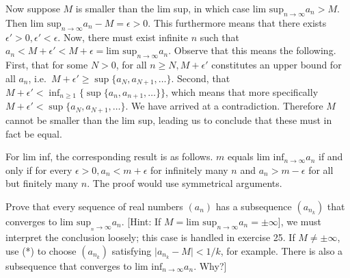 \begin{solution}
    Now suppose $M$ is smaller than the lim sup, in which case $\text{lim sup}_{n\rightarrow \infty} a_n > M$. Then $\text{lim sup}_{n\rightarrow \infty} a_n - M = \epsilon > 0$. This furthermore means that there exists $\epsilon' > 0, \epsilon' < \epsilon$. Now, there must exist infinite $n$ such that $a_n < M + \epsilon' < M + \epsilon = \text{lim sup}_{n \rightarrow \infty} a_n$. Observe that this means the following. First, that for some $N > 0$, for all $n \geq N, M + \epsilon'$ constitutes an upper bound for all $a_n$, i.e.\ $M + \epsilon' \geq \sup\{a_N, a_{N+1}, \ldots\}$. Second, that $M + \epsilon' < \inf_{n \geq 1}\{\sup\{a_n, a_{n+1}, \ldots\}\}$, which means that more specifically $M + \epsilon' < \sup\{a_N, a_{N+1}, \ldots\}$. We have arrived at a contradiction. Therefore $M$ cannot be smaller than the lim sup, leading us to conclude that these must in fact be equal.

    For lim inf, the corresponding result is as follows. $m$ equals $\text{lim inf}_{n \rightarrow \infty} a_n$ if and only if for every $\epsilon > 0, a_n < m + \epsilon$ for infinitely many $n$ and $a_n > m - \epsilon$ for all but finitely many $n$. The proof would use symmetrical arguments.
\end{solution}

\begin{exercise}{27}
    Prove that every sequence of real numbers $(a_n)$ has a subsequence $(a_{n_k})$ that converges to $\text{lim sup}_{_n \rightarrow \infty} a_n$. [Hint: If $M = \text{lim sup}_{n \rightarrow \infty} a_n = \pm \infty$], we must interpret the conclusion loosely; this case is handled in exercise 25. If $M \neq \pm \infty$, use (*) to choose $(a_{n_k})$ satisfying $\lvert a_{n_k} - M \rvert < 1/k$, for example. There is also a subsequence that converges to $\text{lim inf}_{n \rightarrow \infty} a_n$. Why?]
\end{exercise}

